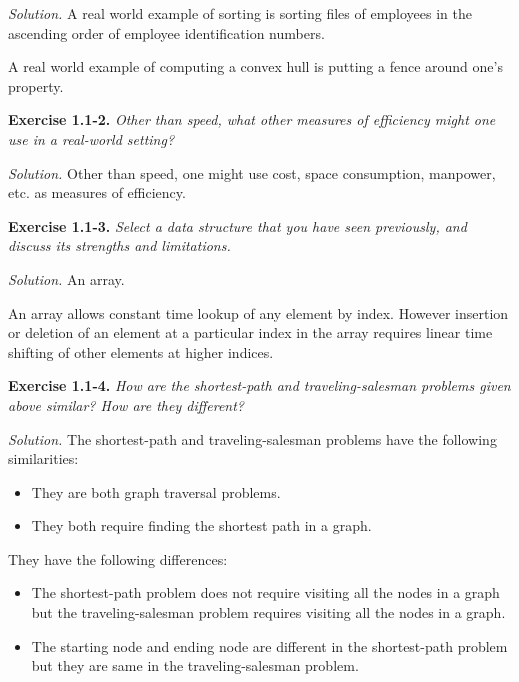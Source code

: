 \documentclass[oneside]{book}
\newenvironment{itenv}[2]
               {\begin{trivlist}\item \textbf{#1 #2.} \itshape}
               {\end{trivlist}}
\newenvironment{exercise}[1]{\begin{itenv}{Exercise}{#1}}{\end{itenv}}
\newenvironment{solution}{\textit{Solution.}}{\vspace{12pt}}
\begin{document}
\begin{solution}
A real world example of sorting is sorting files of employees in the
ascending order of employee identification numbers.

A real world example of computing a convex hull is putting a fence
around one's property.
\end{solution}

\begin{exercise}{1.1-2}
Other than speed, what other measures of efficiency might one use in a
real-world setting?
\end{exercise}

\begin{solution}
Other than speed, one might use cost, space consumption, manpower, etc. as
measures of efficiency.
\end{solution}

\begin{exercise}{1.1-3}
Select a data structure that you have seen previously, and discuss its
strengths and limitations.
\end{exercise}

\begin{solution}
An array.

An array allows constant time lookup of any element by index. However
insertion or deletion of an element at a particular index in the array
requires linear time shifting of other elements at higher indices.
\end{solution}

\begin{exercise}{1.1-4}
How are the shortest-path and traveling-salesman problems given above
similar? How are they different?
\end{exercise}

\begin{solution}
The shortest-path and traveling-salesman problems have the following
similarities:
\begin{itemize}
\item They are both graph traversal problems.
\item They both require finding the shortest path in a graph.
\end{itemize}

They have the following differences:
\begin{itemize}
\item The shortest-path problem does not require visiting all the nodes
      in a graph but the traveling-salesman problem requires visiting
      all the nodes in a graph.
\item The starting node and ending node are different in the
      shortest-path problem but they are same in the traveling-salesman
      problem.
\end{itemize}
\end{solution}
\end{document}
